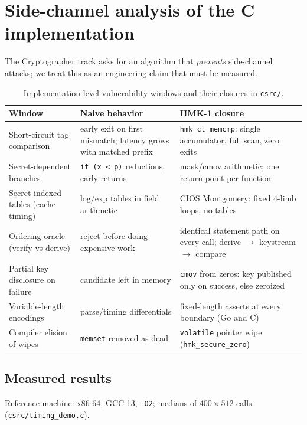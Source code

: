 \section{Side-channel analysis of the C implementation}
\label{sec:sidechannel}
The Cryptographer track asks for an algorithm that \emph{prevents} side-channel
attacks; we treat this as an engineering claim that must be measured.

\begin{table}[h]
\centering
\caption{Implementation-level vulnerability windows and their closures in
\texttt{csrc/}.}
\label{tab:sidechannel}
\begin{tabular}{@{}p{5.4cm}p{4.6cm}p{5.2cm}@{}}
\toprule
\textbf{Window} & \textbf{Naive behavior} & \textbf{HMK-1 closure} \\
\midrule
Short-circuit tag comparison &
  early exit on first mismatch; latency grows with matched prefix &
  \texttt{hmk\_ct\_memcmp}: single accumulator, full scan, zero exits \\
Secret-dependent branches &
  \texttt{if (x < p)} reductions, early returns &
  mask/cmov arithmetic; one return point per function \\
Secret-indexed tables (cache timing) &
  log/exp tables in field arithmetic &
  CIOS Montgomery: fixed 4-limb loops, no tables \\
Ordering oracle (verify-vs-derive) &
  reject before doing expensive work &
  identical statement path on every call; derive $\to$ keystream $\to$ compare \\
Partial key disclosure on failure &
  candidate left in memory &
  \texttt{cmov} from zeros: key published only on success, else zeroized \\
Variable-length encodings &
  parse/timing differentials &
  fixed-length asserts at every boundary (Go and C) \\
Compiler elision of wipes &
  \texttt{memset} removed as dead &
  \texttt{volatile} pointer wipe (\texttt{hmk\_secure\_zero}) \\
\bottomrule
\end{tabular}
\end{table}

\subsection{Measured results}
Reference machine: x86-64, GCC 13, \texttt{-O2}; medians of
$400 \times 512$ calls (\texttt{csrc/timing\_demo.c}).

